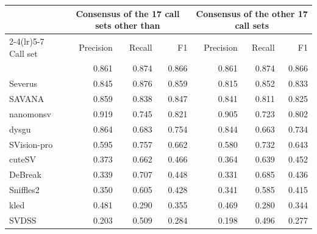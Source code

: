 \begin{tabular}{lrrrrrr}
\toprule
 & \multicolumn{3}{c}{Consensus of the 17 call sets other than \tool{}} & \multicolumn{3}{c}{Consensus of the other 17 call sets} \\
\cmidrule(lr){2-4}\cmidrule(lr){5-7}
Call set & Precision & Recall & F1 & Precision & Recall & F1 \\
\midrule
\tool{} & 0.861 & 0.874 & 0.866 & 0.861 & 0.874 & 0.866 \\
Severus & 0.845 & 0.876 & 0.859 & 0.815 & 0.852 & 0.833 \\
SAVANA & 0.859 & 0.838 & 0.847 & 0.841 & 0.811 & 0.825 \\
nanomonsv & 0.919 & 0.745 & 0.821 & 0.905 & 0.723 & 0.802 \\
dysgu & 0.864 & 0.683 & 0.754 & 0.844 & 0.663 & 0.734 \\
SVision-pro & 0.595 & 0.757 & 0.662 & 0.580 & 0.732 & 0.643 \\
cuteSV & 0.373 & 0.662 & 0.466 & 0.364 & 0.639 & 0.452 \\
DeBreak & 0.339 & 0.707 & 0.448 & 0.331 & 0.685 & 0.436 \\
Sniffles2 & 0.350 & 0.605 & 0.428 & 0.341 & 0.585 & 0.415 \\
kled & 0.481 & 0.290 & 0.355 & 0.469 & 0.280 & 0.344 \\
SVDSS & 0.203 & 0.509 & 0.284 & 0.198 & 0.496 & 0.277 \\
\bottomrule
\end{tabular}
